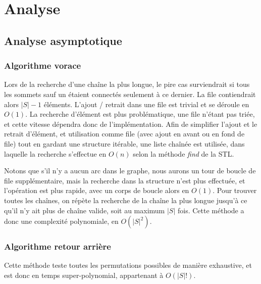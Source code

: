 \documentclass[10pt,a4paper]{article}
\begin{document}


\section{Analyse}

\subsection{Analyse asymptotique}

\subsubsection{Algorithme vorace}

Lors de la recherche d'une chaîne la plus longue, le pire cas surviendrait si tous les sommets sauf un étaient connectés seulement à ce dernier. La file contiendrait alors $ |S| - 1 $ éléments. L'ajout / retrait dans une file est trivial et se déroule en $ O(1) $. La recherche d'élément est plus problématique, une file n'étant pas triée, et cette vitesse dépendra donc de l'implémentation. Afin de simplifier l'ajout et le retrait d'élément, et utilisation comme file (avec ajout en avant ou en fond de file) tout en gardant une structure itérable, une liste chaînée est utilisée, dans laquelle la recherche s'effectue en $ O(n) $ selon la méthode \textit{find} de la STL.

Notons que s'il n'y a aucun arc dans le graphe, nous aurons un tour de boucle de file supplémentaire, mais la recherche dans la structure n'est plus effectuée, et l'opération est plus rapide, avec un corps de boucle alors en $ O(1) $. 
Pour trouver toutes les chaînes, on répète la recherche de la chaîne la plus longue jusqu'à ce qu'il n'y ait plus de chaîne valide, soit au maximum $ |S| $ fois.
Cette méthode a donc une complexité polynomiale, en $ O(|S|^{2}) $.

\subsubsection{Algorithme retour arrière}


Cette méthode teste toutes les permutations possibles de manière exhaustive, et est donc en temps super-polynomial, appartenant à $ O (|S|!) $.
\end{document}
